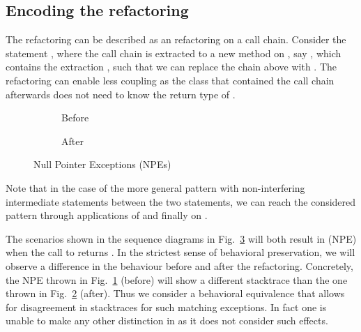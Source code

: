 \subsection{Encoding the  refactoring}\label{sec:hideDelegate}

The  refactoring can be described as an  refactoring on a call chain. Consider the statement ,
where the call chain is extracted to a new method on , say , which contains the extraction , such that we can replace the chain above with .
The refactoring can enable less coupling as the class that contained the call chain afterwards does not need to know the return type of .

\begin{figure}[tbp]
  \centering
  \begin{subfigure}{.3\linewidth}
    
    \vspace{-5mm}
    \caption{Before}
    \label{fig:hd-npe-before}
  \end{subfigure}
  \hspace{1.5cm}
  \begin{subfigure}{.3\linewidth}
    
    \vspace{-5mm}
    \caption{After}
    \label{fig:hd-npe-after}    
  \end{subfigure}
  \caption{Null Pointer Exceptions (NPEs)}
  \label{fig:NPEs}
\end{figure}

Note that in the case of the more general pattern  with non-interfering intermediate statements between the two statements,
we can reach the considered pattern through applications of  and finally  on .



The scenarios shown in the sequence diagrams in Fig.~\ref{fig:NPEs} will both result in  (NPE) when the call to  returns .
In the strictest sense of behavioral preservation,
we will observe a difference in the behaviour before and after the refactoring.  Concretely, the NPE thrown in Fig.~\ref{fig:hd-npe-before} (before) will show a different stacktrace than the one thrown in Fig.~\ref{fig:hd-npe-after} (after).
Thus we consider a behavioral equivalence that allows for disagreement in stacktraces for such matching exceptions. In fact one is unable to make any other distinction in \Refinity{} as it does not consider such effects.

